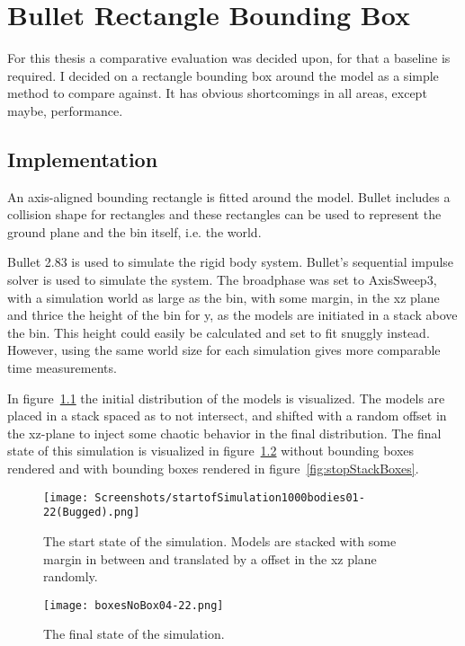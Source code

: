 \chapter{Bullet Rectangle Bounding Box}\label{cha:meth}
For this thesis a comparative evaluation was decided upon, for that a baseline is
required. I decided on a rectangle bounding box around the model
as a simple method to compare against. It has obvious shortcomings in all
areas, except maybe, performance.

\section{Implementation}\label{sec:recImpl}
An axis-aligned bounding rectangle is fitted around the model.
Bullet includes a collision shape for rectangles and these rectangles can be used
to represent the ground plane and the bin itself, i.e. the world.

Bullet 2.83 is used to simulate the rigid body system.
Bullet's sequential impulse solver is used to simulate the system. The broadphase
was set to AxisSweep3, with a simulation world as large as the bin, with some margin, in the
xz plane and thrice the height of the bin for y, as the models are initiated in a stack
above the bin. This height could easily be calculated and set to fit snuggly instead.
However, using the same world size for each simulation gives more comparable time measurements.

In figure~\ref{fig:startStack} the initial distribution of the models is visualized.
The models are placed in a stack spaced as to not intersect, and shifted with a random
offset in the xz-plane to inject some chaotic behavior in the final distribution.
The final state of this simulation is visualized in figure~\ref{fig:stopStack}
without bounding boxes rendered and with bounding boxes rendered in figure~\ref{fig:stopStackBoxes}.

\begin{figure}[H]
  \centering
  \texttt{[image: Screenshots/startofSimulation1000bodies01-22(Bugged).png]}
  \caption{The start state of the simulation. Models are stacked with some margin in between and translated by a offset in the xz plane randomly. }
  \label{fig:startStack}
\end{figure}

\begin{figure}[H]
  \centering
  \texttt{[image: boxesNoBox04-22.png]}
  \caption{The final state of the simulation.}
  \label{fig:stopStack}
\end{figure}

